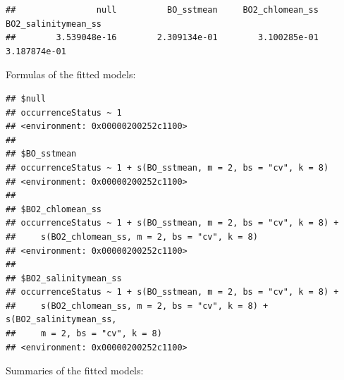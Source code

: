 \documentclass[
]{book}
\newenvironment{Shaded}{\begin{snugshade}}{\end{snugshade}}
\newcommand{\FunctionTok}[1]{\textcolor[rgb]{0.00,0.00,0.00}{#1}}
\newcommand{\NormalTok}[1]{#1}
\newcommand{\SpecialCharTok}[1]{\textcolor[rgb]{0.00,0.00,0.00}{#1}}
\begin{document}
\begin{verbatim}
##                null          BO_sstmean     BO2_chlomean_ss BO2_salinitymean_ss 
##        3.539048e-16        2.309134e-01        3.100285e-01        3.187874e-01
\end{verbatim}

Formulas of the fitted models:

\begin{Shaded}
\end{Shaded}

\begin{verbatim}
## $null
## occurrenceStatus ~ 1
## <environment: 0x00000200252c1100>
## 
## $BO_sstmean
## occurrenceStatus ~ 1 + s(BO_sstmean, m = 2, bs = "cv", k = 8)
## <environment: 0x00000200252c1100>
## 
## $BO2_chlomean_ss
## occurrenceStatus ~ 1 + s(BO_sstmean, m = 2, bs = "cv", k = 8) + 
##     s(BO2_chlomean_ss, m = 2, bs = "cv", k = 8)
## <environment: 0x00000200252c1100>
## 
## $BO2_salinitymean_ss
## occurrenceStatus ~ 1 + s(BO_sstmean, m = 2, bs = "cv", k = 8) + 
##     s(BO2_chlomean_ss, m = 2, bs = "cv", k = 8) + s(BO2_salinitymean_ss, 
##     m = 2, bs = "cv", k = 8)
## <environment: 0x00000200252c1100>
\end{verbatim}

Summaries of the fitted models:

\begin{Shaded}
\end{Shaded}
\end{document}
